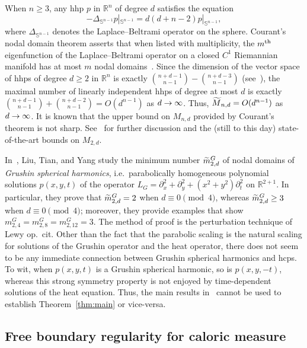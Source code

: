 \documentclass[AHL,Unicode,longabstracts,published]{cedram}
\newcommand{\R}{\mathbb{R}}
\newcommand{\sphere}{\mathbb{S}}
\let\oldtilde\tilde
\renewcommand*{\tilde}[1]{\mathchoice{\widetilde{#1}}{\widetilde{#1}}{\oldtilde{#1}}{\oldtilde{#1}}}
\renewcommand*{\to}{\mathchoice{\longrightarrow}{\rightarrow}{\rightarrow}{\rightarrow}}
\newcommand{\R}{\mathbb{R}}
\begin{document}
When $n\geq 3$, any hhp $p$ in $\R^n$ of degree $d$ satisfies the equation
\[
-\Delta_{\sphere^{n-1}} p|_{\sphere^{n-1}} = d(d+n-2)p|_{\sphere^{n-1}},
\]
where $\Delta_{\sphere^{n-1}}$ denotes the Laplace--Beltrami operator on the sphere. Courant's nodal domain theorem asserts that when listed with multiplicity, the $m^{\rm th}$ eigenfunction of the Laplace--Beltrami operator on a closed $C^1$ Riemannian manifold has at most $m$ nodal domains~\cite{CH,local-courant}. Since the dimension of the vector space of hhps of degree $d \ge 2$ in $\R^n$ is exactly $\binom{n+d-1}{n-1} - \binom{n+d-3}{n-1}$ (see~\cite[Proposition~5.8]{ABR}), the maximal number of linearly independent hhps of degree at most $d$ is exactly $\binom{n+d-1}{n-1} + \binom{n+d-2}{n-1}=O(d^{n-1})$ as $d\to\infty$. Thus, $\tilde M_{n,d}=O(d^{n-1})$ as $d\to\infty$. It is known that the upper bound on $M_{n,d}$ provided by Courant's theorem is not sharp. See~\cite{Leydold96} for further discussion and the (still to this day) state-of-the-art bounds on $M_{2,d}$.

In~\cite{LTY15}, Liu, Tian, and Yang study the minimum number $\tilde m^G_{2,d}$ of nodal domains of \emph{Grushin spherical harmonics}, i.e.~parabolically homogeneous polynomial solutions $p(x,y,t)$ of the operator $L_G=\partial_x^2 + \partial_y^2 + (x^2 + y^2) \partial_t^2$ on $\R^{2+1}$. In particular, they prove that $\tilde m^G_{2,d}=2$ when $d\equiv 0\pmod{4}$, whereas $\tilde m^G_{2,d}\geq 3$ when $d\equiv 0\pmod{4}$; moreover, they provide examples that show $m^G_{2,4}=m^G_{2,8}=m^G_{2,12}=3$. The method of proof is the perturbation technique of Lewy op.~cit. Other than the fact that the parabolic scaling is the natural scaling for solutions of the Grushin operator and the heat operator, there does not seem to be any immediate connection between Grushin spherical harmonics and hcps. To wit, when $p(x,y,t)$ is a Grushin spherical harmonic, so is $p(x,y,-t)$, whereas this strong symmetry property is not enjoyed by time-dependent solutions of the heat equation. Thus, the main results in~\cite{LTY15} cannot be used to establish Theorem~\ref{thm:main} or vice-versa.


\subsection{Free boundary regularity for caloric measure} \label{ss:2-phase}
\end{document}
